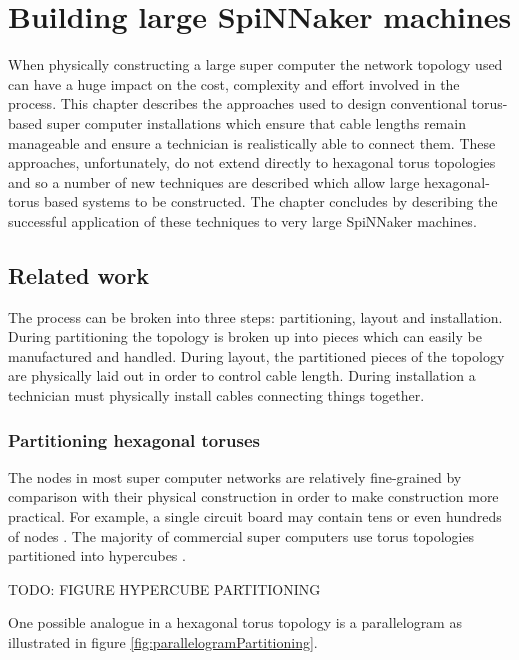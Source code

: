 \chapter{Building large SpiNNaker machines}
	
	When physically constructing a large super computer the network topology used
	can have a huge impact on the cost, complexity and effort involved in the
	process. This chapter describes the approaches used to design conventional
	torus-based super computer installations which ensure that cable lengths
	remain manageable and ensure a technician is realistically able to connect
	them. These approaches, unfortunately, do not extend directly to hexagonal
	torus topologies and so a number of new techniques are described which allow
	large hexagonal-torus based systems to be constructed. The chapter concludes
	by describing the successful application of these techniques to very large
	SpiNNaker machines.
	
	\section{Related work}
		
		The process can be broken into three steps: partitioning, layout and
		installation. During partitioning the topology is broken up into pieces
		which can easily be manufactured and handled. During layout, the
		partitioned pieces of the topology are physically laid out in order to
		control cable length. During installation a technician must physically
		install cables connecting things together.
		
		\subsection{Partitioning hexagonal toruses}
			
			The nodes in most super computer networks are relatively fine-grained by
			comparison with their physical construction in order to make construction
			more practical. For example, a single circuit board may contain tens or
			even hundreds of nodes \cite{gilge14,ajima12}. The majority of commercial
			super computers use torus topologies partitioned into hypercubes
			\cite{chen11,ajima12}.
			
			TODO: FIGURE HYPERCUBE PARTITIONING
			
			One possible analogue in a hexagonal torus topology is a parallelogram as
			illustrated in figure \ref{fig:parallelogramPartitioning}.
			
